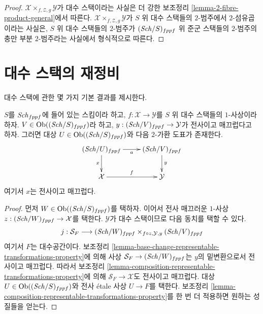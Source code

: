 \begin{proof}
$\mathcal{X} \times_{f, \mathcal{Z}, g} \mathcal{Y}$가 대수 스택이라는
사실은 더 강한 보조정리 \ref{lemma-2-fibre-product-general}에서 따른다.
$\mathcal{X} \times_{f, \mathcal{Z}, g} \mathcal{Y}$가 $S$ 위 대수
스택들의 $2$-범주에서 $2$-섬유곱이라는 사실은, $S$ 위 대수 스택들의
$2$-범주가 $(\mathit{Sch}/S)_{fppf}$ 위 준군 스택들의 $2$-범주의 충만 부분
$2$-범주라는 사실에서 형식적으로 따른다.
\end{proof}







\section{대수 스택의 재정비}
\label{section-overhaul}

\noindent
대수 스택에 관한 몇 가지 기본 결과를 제시한다.

\begin{lemma}
\label{lemma-lift-morphism-presentations}
$S$를 $\mathit{Sch}_{fppf}$에 들어 있는 스킴이라 하고,
$f : \mathcal{X} \to \mathcal{Y}$를 $S$ 위 대수 스택들의 $1$-사상이라
하자. $V \in \mathop{\mathrm{Ob}}\nolimits((\mathit{Sch}/S)_{fppf})$라 하고,
$y : (\mathit{Sch}/V)_{fppf} \to \mathcal{Y}$가 전사이고 매끄럽다고 하자.
그러면 대상 $U \in \mathop{\mathrm{Ob}}\nolimits((\mathit{Sch}/S)_{fppf})$와 다음 $2$-가환 도표가
존재한다.
$$
\xymatrix{
(\Sch/U)_{fppf} \ar[r]_a \ar[d]_x &
(\Sch/V)_{fppf} \ar[d]^y \\
\mathcal{X} \ar[r]^f & \mathcal{Y}
}
$$
여기서 $x$는 전사이고 매끄럽다.
\end{lemma}

\begin{proof}
먼저 $W \in \mathop{\mathrm{Ob}}\nolimits((\mathit{Sch}/S)_{fppf})$를 택하자. 이어서 전사 매끄러운 $1$-사상
$z : (\mathit{Sch}/W)_{fppf} \to \mathcal{X}$를 택한다. $\mathcal{Y}$가
대수 스택이므로 다음 동치를 택할 수 있다.
$$
j :
\mathcal{S}_F
\longrightarrow
(\mathit{Sch}/W)_{fppf}
\times_{f \circ z, \mathcal{Y}, y}
(\mathit{Sch}/V)_{fppf}
$$
여기서 $F$는 대수공간이다. 보조정리
\ref{lemma-base-change-representable-transformations-property}에 의해 사상
$\mathcal{S}_F \to (\mathit{Sch}/W)_{fppf}$는 $y$의 밑변환으로서 전사이고
매끄럽다. 따라서 보조정리
\ref{lemma-composition-representable-transformations-property}에 의해
$\mathcal{S}_F \to \mathcal{X}$도 전사이고 매끄럽다. 대상
$U \in \mathop{\mathrm{Ob}}\nolimits((\mathit{Sch}/S)_{fppf})$와 전사 \'etale 사상 $U \to F$를 택한다.
보조정리 \ref{lemma-composition-representable-transformations-property}를
한 번 더 적용하면 원하는 성질들을 얻는다.
\end{proof}

